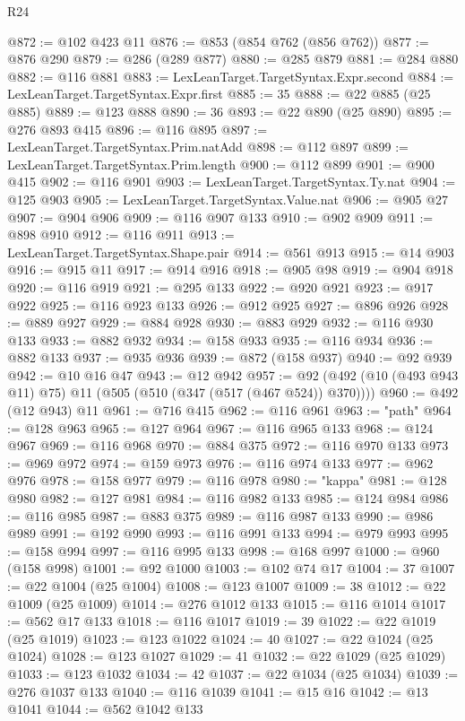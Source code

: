 \begin{lexlean}{R24}
\begin{coremodule}
@872 := @102 @423 @11
@876 := @853 (@854 @762 (@856 @762))
@877 := @876 @290
@879 := @286 (@289 @877)
@880 := @285 @879
@881 := @284 @880
@882 := @116 @881
@883 := LexLeanTarget.TargetSyntax.Expr.second
@884 := LexLeanTarget.TargetSyntax.Expr.first
@885 := 35
@888 := @22 @885 (@25 @885)
@889 := @123 @888
@890 := 36
@893 := @22 @890 (@25 @890)
@895 := @276 @893 @415
@896 := @116 @895
@897 := LexLeanTarget.TargetSyntax.Prim.natAdd
@898 := @112 @897
@899 := LexLeanTarget.TargetSyntax.Prim.length
@900 := @112 @899
@901 := @900 @415
@902 := @116 @901
@903 := LexLeanTarget.TargetSyntax.Ty.nat
@904 := @125 @903
@905 := LexLeanTarget.TargetSyntax.Value.nat
@906 := @905 @27
@907 := @904 @906
@909 := @116 @907 @133
@910 := @902 @909
@911 := @898 @910
@912 := @116 @911
@913 := LexLeanTarget.TargetSyntax.Shape.pair
@914 := @561 @913
@915 := @14 @903
@916 := @915 @11
@917 := @914 @916
@918 := @905 @98
@919 := @904 @918
@920 := @116 @919
@921 := @295 @133
@922 := @920 @921
@923 := @917 @922
@925 := @116 @923 @133
@926 := @912 @925
@927 := @896 @926
@928 := @889 @927
@929 := @884 @928
@930 := @883 @929
@932 := @116 @930 @133
@933 := @882 @932
@934 := @158 @933
@935 := @116 @934
@936 := @882 @133
@937 := @935 @936
@939 := @872 (@158 @937)
@940 := @92 @939
@942 := @10 @16 @47
@943 := @12 @942
@957 := @92 (@492 (@10 (@493 @943 @11) @75) @11 (@505 (@510 (@347 (@517 (@467 @524)) @370))))
@960 := @492 (@12 @943) @11
@961 := @716 @415
@962 := @116 @961
@963 := "path"
@964 := @128 @963
@965 := @127 @964
@967 := @116 @965 @133
@968 := @124 @967
@969 := @116 @968
@970 := @884 @375
@972 := @116 @970 @133
@973 := @969 @972
@974 := @159 @973
@976 := @116 @974 @133
@977 := @962 @976
@978 := @158 @977
@979 := @116 @978
@980 := "kappa"
@981 := @128 @980
@982 := @127 @981
@984 := @116 @982 @133
@985 := @124 @984
@986 := @116 @985
@987 := @883 @375
@989 := @116 @987 @133
@990 := @986 @989
@991 := @192 @990
@993 := @116 @991 @133
@994 := @979 @993
@995 := @158 @994
@997 := @116 @995 @133
@998 := @168 @997
@1000 := @960 (@158 @998)
@1001 := @92 @1000
@1003 := @102 @74 @17
@1004 := 37
@1007 := @22 @1004 (@25 @1004)
@1008 := @123 @1007
@1009 := 38
@1012 := @22 @1009 (@25 @1009)
@1014 := @276 @1012 @133
@1015 := @116 @1014
@1017 := @562 @17 @133
@1018 := @116 @1017
@1019 := 39
@1022 := @22 @1019 (@25 @1019)
@1023 := @123 @1022
@1024 := 40
@1027 := @22 @1024 (@25 @1024)
@1028 := @123 @1027
@1029 := 41
@1032 := @22 @1029 (@25 @1029)
@1033 := @123 @1032
@1034 := 42
@1037 := @22 @1034 (@25 @1034)
@1039 := @276 @1037 @133
@1040 := @116 @1039
@1041 := @15 @16
@1042 := @13 @1041
@1044 := @562 @1042 @133

\end{coremodule}
\end{lexlean}
